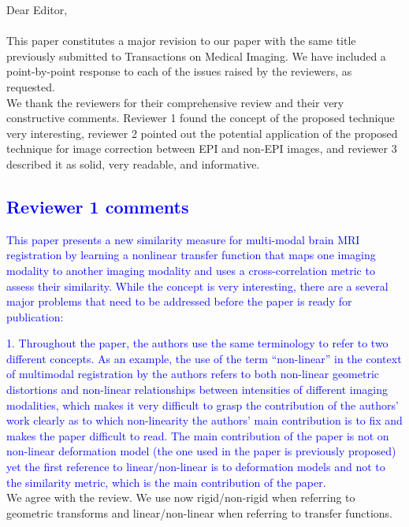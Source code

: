 \documentclass[onecolumn]{IEEEtran}
\begin{document}
Dear Editor,\\\\
This paper constitutes a major revision to our paper with the same title previously submitted to Transactions on Medical Imaging. We have included a point-by-point response to each of the issues raised by the reviewers, as requested.\\

We thank the reviewers for their comprehensive review and their very constructive comments.  Reviewer 1 found the concept of the proposed technique very interesting, reviewer 2 pointed out the potential application of the proposed technique for image correction between EPI and non-EPI images, and reviewer 3 described it as solid, very readable, and informative.

\textcolor{blue}{\section{Reviewer 1 comments}
This paper presents a new similarity measure for multi-modal brain MRI registration by learning a nonlinear transfer function that maps one imaging modality to another imaging modality and uses a cross-correlation metric to assess their similarity.  While the concept is very interesting, there are a several major problems that need to be addressed before the paper is ready for publication:}

\textcolor{blue}{
1. Throughout the paper, the authors use the same terminology to refer to two different concepts.  As an example, the use of the term ``non-linear'' in the context of multimodal registration by the authors refers to both non-linear geometric distortions and non-linear relationships between intensities of different imaging modalities, which makes it very difficult to grasp the contribution of the authors' work clearly as to which non-linearity the authors' main contribution is to fix and makes the paper difficult to read.  The main contribution of the paper is not on non-linear deformation model (the one used in the paper is previously proposed) yet the first reference to linear/non-linear is to deformation models and not to the similarity metric, which is the main contribution of the paper.}\\

We agree with the review. We use now rigid/non-rigid when referring to geometric transforms and linear/non-linear when referring to transfer functions.\\
\end{document}
